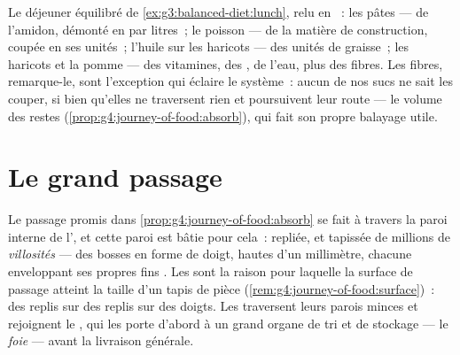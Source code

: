 \begin{example}\label{ex:g7:digestion-and-nutrients:lunch}
Le déjeuner équilibré de \cref{ex:g3:balanced-diet:lunch}, relu en
~: les pâtes --- de l'amidon, démonté en  par
litres~; le poisson --- de la matière de construction, coupée en ses
unités~; l'huile sur les haricots --- des unités de graisse~; les
haricots et la pomme --- des vitamines, des , de l'eau,
plus des fibres. Les fibres, remarque-le, sont l'exception qui
éclaire le système~: aucun de nos sucs ne sait les couper, si bien
qu'elles ne traversent rien et poursuivent leur route --- le volume
des restes (\cref{prop:g4:journey-of-food:absorb}), qui fait son
propre balayage utile.
\end{example}

\section{Le grand passage}

\begin{proposition}\label{prop:g7:digestion-and-nutrients:absorption}
Le passage promis dans
\cref{prop:g4:journey-of-food:absorb} se fait à travers la paroi
interne de l', et cette paroi est bâtie pour cela~:
repliée, et tapissée de millions de
\emph{villosités} --- des bosses en forme de doigt,
hautes d'un millimètre, chacune enveloppant ses propres fins
. Les  sont la raison pour laquelle la
surface de passage atteint la taille d'un tapis de pièce
(\cref{rem:g4:journey-of-food:surface})~: des replis sur des replis
sur des doigts. Les  traversent leurs parois minces et
rejoignent le , qui les porte d'abord à un grand organe de tri
et de stockage --- le \emph{foie} --- avant la livraison
générale.
\end{proposition}
\admitted

